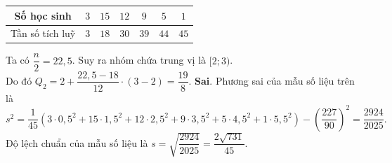 \begin{ex}
{\begin{itemchoice}
\begin{center}
\begin{tabular}{|c|c|c|c|c|c|c|}
					\hline
					Số học sinh & $3$ & $15$ & $12$ & $9$ & $5$ & $1$ \\
					\hline
					Tần số tích luỹ & $3$ & $18$ & $30$ & $39$ & $44$ & $45$ \\
					\hline
				\end{tabular}
			\end{center}
			Ta có $\dfrac{n}{2}=22{,}5$. Suy ra nhóm chứa trung vị là $[2;3)$. \\
			Do đó $Q_2 = 2 + \dfrac{22{,}5-18}{12}\cdot (3-2) = \dfrac{19}{8}$.
			\itemch \textbf{Sai}. Phương sai của mẫu số liệu trên là
			$$s^2 = \dfrac{1}{45}\left(3\cdot 0{,}5^2 + 15\cdot 1{,}5^2 + 12\cdot 2{,}5^2 + 9\cdot 3{,}5^2 +5\cdot 4{,}5^2 +1\cdot 5{,}5^2\right)-\left(\dfrac{227}{90}\right)^2 = \dfrac{2924}{2025}.$$
			Độ lệch chuẩn của mẫu số liệu là $s = \sqrt{\dfrac{2924}{2025}} = \dfrac{2\sqrt{731}}{45}$.
		\end{itemchoice}
	}
\end{ex}

